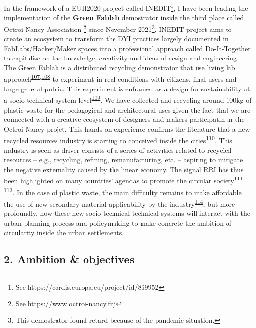 \documentclass[
  12pt,
  a4paperpaper,
  onecolumn]{article}
\begin{document}
In the framework of a EUH2020 project called INEDIT\footnote{See
  https://cordis.europa.eu/project/id/869952}, I have been leading the
implementation of the \textbf{Green Fablab} demostrator inside the third
place called Octroi-Nancy Association \footnote{See
  https://www.octroi-nancy.fr/} since November 2021\footnote{This
  demostrator found retard because of the pandemic situation.}. INEDIT
project aims to create an ecosystem to transform the DYI practices
largely documented in FabLabs/Hacker/Maker spaces into a professional
approach called Do-It-Together to capitalise on the knowledge,
creativity and ideas of design and engineering. The Green Fablab is a
distributed recycling demonstrator that use living lab
approach\textsuperscript{\protect\hyperlink{ref-tyl2021}{107},\protect\hyperlink{ref-compagnucci2020a}{108}}
to experiment in real conditions with citizens, final users and large
general public. This experiment is enframed as a design for
sustainability at a socio-technical system
level\textsuperscript{\protect\hyperlink{ref-Ceschin2016}{109}}. We have
collected and recycling around 100kg of plastic waste for the
pedagogical and architectural uses given the fact that we are connected
with a creative ecosystem of designers and makers participatin in the
Octroi-Nancy projet. This hands-on experience confirms the literature
that a new recycled resources industry is starting to conceived inside
the cities\textsuperscript{\protect\hyperlink{ref-wang2019b}{110}}. This
industry is seen as driver consists of a series of activities related to
recycled resources -- e.g., recycling, refining, remanufacturing, etc.
-- aspiring to mitigate the negative externality caused by the linear
economy. The signal RRI has thus been highlighted on many countries'
agendas to promote the circular
society\textsuperscript{\protect\hyperlink{ref-leipold2021}{111}--\protect\hyperlink{ref-jaeger-erben2021a}{113}}.
In the case of plastic waste, the main difficulty remains to make
affordable the use of new secondary material applicability by the
industry\textsuperscript{\protect\hyperlink{ref-klotz2022}{114}}, but
more profoundly, how these new socio-technical technical systems will
interact with the urban planning process and policymaking to make
concrete the ambition of circularity inside the urban settlements.

\hypertarget{ambition-objectives}{%
\subsection{2. Ambition \& objectives}\label{ambition-objectives}}
\end{document}

